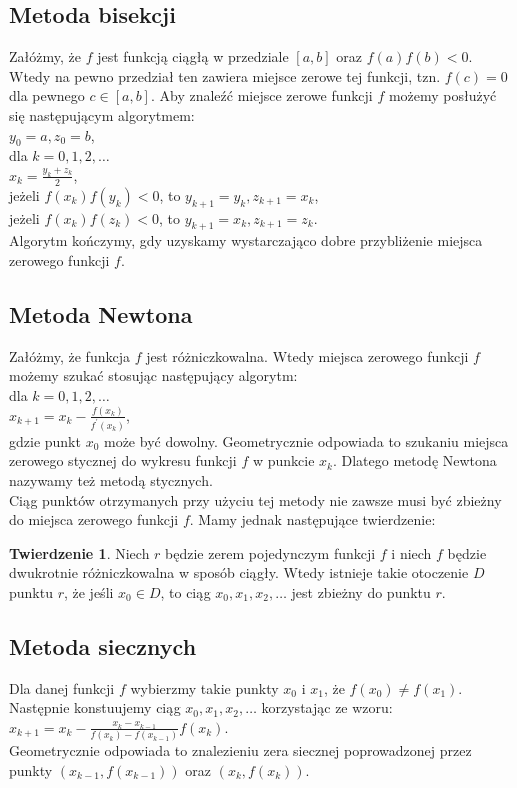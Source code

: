 \documentclass[12pt,a4paper]{article}
\theoremstyle{definition}
\newtheorem{thm}{Twierdzenie}
\begin{document}
\subsection*{Metoda bisekcji}
Załóżmy, że $f$ jest funkcją ciągłą w przedziale $[a,b]$ oraz $f(a)f(b)<0$. Wtedy na pewno przedział ten zawiera miejsce zerowe tej funkcji, tzn. $f(c)=0$ dla pewnego $c\in [a,b]$. Aby znaleźć miejsce zerowe funkcji $f$ możemy posłużyć się następującym algorytmem:\\
$y_0=a,z_0=b$,\\
dla $k=0,1,2,\ldots$\\
$x_k=\frac{y_k+z_k}{2}$,\\
jeżeli $f(x_k)f(y_k)<0$, to $y_{k+1}=y_k,z_{k+1}=x_k$,\\
jeżeli $f(x_k)f(z_k)<0$, to $y_{k+1}=x_k,z_{k+1}=z_k$.\\
Algorytm kończymy, gdy uzyskamy wystarczająco dobre przybliżenie miejsca zerowego funkcji $f$.
\subsection*{Metoda Newtona}
Załóżmy, że funkcja $f$ jest różniczkowalna. Wtedy miejsca zerowego funkcji $f$ możemy szukać stosując następujący algorytm:\\
dla $k=0,1,2,\ldots$\\
$x_{k+1}=x_k-\frac{f(x_k)}{f^{'}(x_k)}$,\\
gdzie punkt $x_0$ może być dowolny. Geometrycznie odpowiada to szukaniu miejsca zerowego stycznej do wykresu funkcji $f$ w punkcie $x_k$. Dlatego metodę Newtona nazywamy też metodą stycznych.\\
Ciąg punktów otrzymanych przy użyciu tej metody nie zawsze musi być zbieżny do miejsca zerowego funkcji $f$. Mamy jednak następujące twierdzenie:
\begin{thm}
	Niech $r$ będzie zerem pojedynczym funkcji $f$ i niech $f$ będzie dwukrotnie różniczkowalna w sposób ciągły. Wtedy istnieje takie otoczenie $D$ punktu $r$, że jeśli $x_0\in D$, to ciąg $x_0,x_1,x_2,\ldots$ jest zbieżny do punktu $r$.
\end{thm}
\subsection*{Metoda siecznych}
Dla danej funkcji $f$ wybierzmy takie punkty $x_0$ i $x_1$, że $f(x_0)\neq f(x_1)$. Następnie konstuujemy ciąg $x_0,x_1,x_2,\ldots$ korzystając ze wzoru:\\
$x_{k+1}=x_k-\frac{x_k-x_{k-1}}{f(x_k)-f(x_{k-1})}f(x_k)$.\\
Geometrycznie odpowiada to znalezieniu zera siecznej poprowadzonej przez punkty $(x_{k-1},f(x_{k-1}))$ oraz $(x_k,f(x_k))$.
\end{document}
